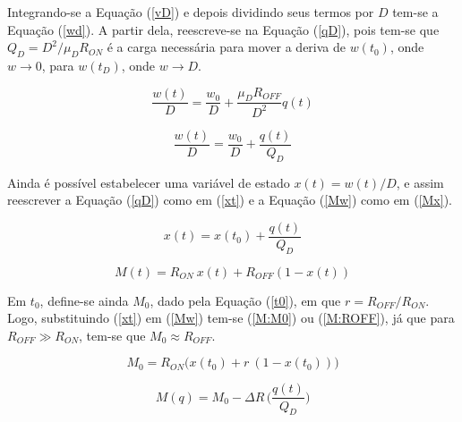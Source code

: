 \documentclass{ceel}
\begin{document}
\begin{multicols}{2}
Integrando-se a Equação (\ref{vD}) e depois dividindo seus termos por $D$ tem-se a Equação (\ref{wd}).
A partir dela, reescreve-se na Equação (\ref{qD}), pois tem-se que $Q_D=D^2/\mu_D R_{ON}$ é a carga necessária para mover a deriva de $w(t_0)$, onde $w\rightarrow 0$, para $w(t_D)$, onde $w\rightarrow D$.

\begin{equation}\label{wd}
\dfrac{w(t)}{D}=\dfrac{w_0}{D}+\dfrac{\mu_D R_{OFF}}{D^2}q(t)
\end{equation}

\begin{equation}\label{qD}
\dfrac{w(t)}{D}=\dfrac{w_0}{D}+\dfrac{q(t)}{Q_D}
\end{equation}
\vspace{0.05cm}

Ainda é possível estabelecer uma variável de estado $x(t)=w(t)/D$, e assim reescrever a Equação (\ref{qD}) como em (\ref{xt}) e a Equação (\ref{Mw}) como em (\ref{Mx}).

\begin{equation}\label{xt}
x(t)=x(t_0)+\dfrac{q(t)}{Q_D}
\end{equation}

\begin{equation}\label{Mx}
M(t)=R_{ON}\ x(t)+ R_{OFF}(1-x(t))
\end{equation}
\vspace{0.05cm}

Em $t_0$, define-se ainda $M_0$, dado pela Equação (\ref{t0}), em que $r=R_{OFF}/R_{ON}$. Logo, substituindo (\ref{xt}) em (\ref{Mw}) tem-se (\ref{M:M0}) ou (\ref{M:ROFF}), já que para $R_{OFF}\gg R_{ON}$, tem-se que $M_0\approx R_{OFF}$.
\vspace{0.05cm}

\begin{equation}\label{t0}
M_0  =R_{ON}\big( x(t_0)+ r\ (1-x(t_0))\big)
\end{equation}

\begin{equation}\label{M:M0}%
M(q)=M_0-\Delta R\, \bigg(\dfrac{q(t)}{Q_D}\bigg)
\end{equation}


\end{multicols}
\end{document}
